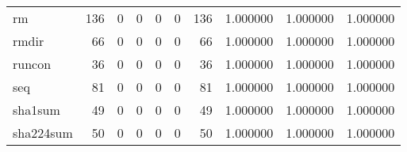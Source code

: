 \begin{tabular}{lrrrrrrrrr}
rm        &                                       136 &                                                  0 &                                                  0 &                                                  0 &                                                  0 &                                                136 &                                           1.000000 &                               1.000000 &                             1.000000 \\
rmdir     &                                        66 &                                                  0 &                                                  0 &                                                  0 &                                                  0 &                                                 66 &                                           1.000000 &                               1.000000 &                             1.000000 \\
runcon    &                                        36 &                                                  0 &                                                  0 &                                                  0 &                                                  0 &                                                 36 &                                           1.000000 &                               1.000000 &                             1.000000 \\
seq       &                                        81 &                                                  0 &                                                  0 &                                                  0 &                                                  0 &                                                 81 &                                           1.000000 &                               1.000000 &                             1.000000 \\
sha1sum   &                                        49 &                                                  0 &                                                  0 &                                                  0 &                                                  0 &                                                 49 &                                           1.000000 &                               1.000000 &                             1.000000 \\
sha224sum &                                        50 &                                                  0 &                                                  0 &                                                  0 &                                                  0 &                                                 50 &                                           1.000000 &                               1.000000 &                             1.000000 \\

\end{tabular}
